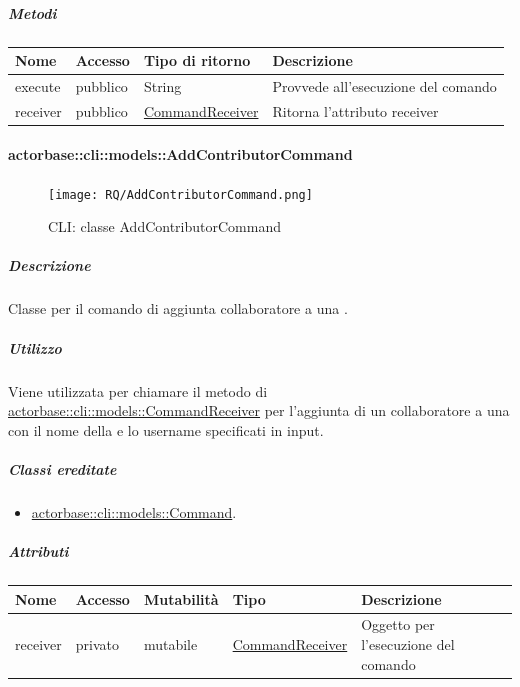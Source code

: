 \documentclass{scalatekids-article}
\begin{document}
\subparagraph{Metodi}

\begin{tabular}{| p{3cm} | p{1.5cm} | p{3.5cm} | p{9cm} |}
  \hline
  Nome & Accesso & Tipo di ritorno & Descrizione\\
  \hline
  execute & pubblico & String & Provvede all'esecuzione del comando\\
  \hline
  receiver & pubblico & \hyperref[sec:actorbase::cli::models::CommandReceiver]{CommandReceiver} & Ritorna l'attributo receiver\\
  \hline
\end{tabular}

\paragraph{actorbase::cli::models::AddContributorCommand}
\label{sec:actorbase::cli::models::AddContributorCommand}

\begin{figure}[H]
  \begin{center}
    \texttt{[image: RQ/AddContributorCommand.png]}
    \caption{CLI: classe AddContributorCommand}
  \end{center}
\end{figure}

\subparagraph{Descrizione}

Classe per il comando di aggiunta collaboratore a una .

\subparagraph{Utilizzo}

Viene utilizzata per chiamare il metodo di
\hyperref[sec:actorbase::cli::models::CommandReceiver]{actorbase::cli::models::CommandReceiver} per l'aggiunta di un collaboratore a
una  con il nome della  e lo username specificati
in input.

\subparagraph{Classi ereditate}

\begin{itemize}
\item \hyperref[sec:actorbase::cli::models::Command]{actorbase::cli::models::Command}.
\end{itemize}

\subparagraph{Attributi}

\begin{tabular}{| p{1cm} | p{1.5cm} | p{2cm} | p{4cm} | p{8.5cm} |}
  \hline
  Nome & Accesso & Mutabilità & Tipo & Descrizione\\
  \hline
  receiver & privato & mutabile & \hyperref[sec:actorbase::cli::models::CommandReceiver]{CommandReceiver} & Oggetto per l'esecuzione del comando\\
  \hline
\end{tabular}
\end{document}
